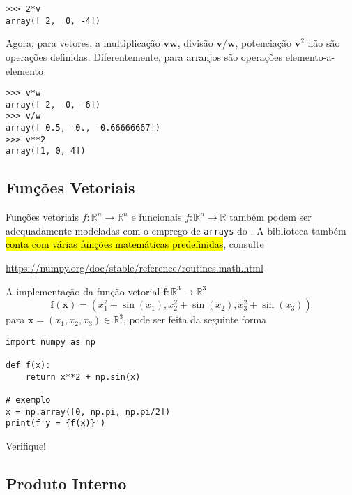 \begin{ex}
\begin{lstlisting}
>>> 2*v
array([ 2,  0, -4])
\end{lstlisting}

  Agora, para vetores, a multiplicação $\pmb{v}\pmb{w}$, divisão $\pmb{v}/\pmb{w}$, potenciação $\pmb{v}^2$ não são operações definidas. Diferentemente, para arranjos são operações elemento-a-elemento

\begin{lstlisting}
>>> v*w
array([ 2,  0, -6])
>>> v/w
array([ 0.5, -0., -0.66666667])
>>> v**2
array([1, 0, 4])
\end{lstlisting}

\end{ex}

\subsection{Funções Vetoriais}

Funções vetoriais $f:\mathbb{R}^n\to\mathbb{R}^n$ e funcionais $f:\mathbb{R}^n\to\mathbb{R}$ também podem ser adequadamente modeladas com o emprego de \texttt{arrays} do \hl{{\numpy}}. A biblioteca também \hl{conta com várias funções matemáticas predefinidas}, consulte
\begin{center}
  \url{https://numpy.org/doc/stable/reference/routines.math.html}
\end{center}

\begin{ex}
  A implementação da função vetorial $\pmb{f}:\mathbb{R}^3\to\mathbb{R}^3$
  \begin{equation}
    \pmb{f}(\pmb{x}) = (x_1^2+\sin(x_1), x_2^2+\sin(x_2), x_3^2+\sin(x_3))
  \end{equation}
  para $\pmb{x} = (x_1, x_2, x_3)\in\mathbb{R}^3$, pode ser feita da seguinte forma

\begin{lstlisting}
import numpy as np

def f(x):
    return x**2 + np.sin(x)

# exemplo
x = np.array([0, np.pi, np.pi/2])
print(f'y = {f(x)}')
\end{lstlisting}

Verifique!
\end{ex}

\subsection{Produto Interno}

